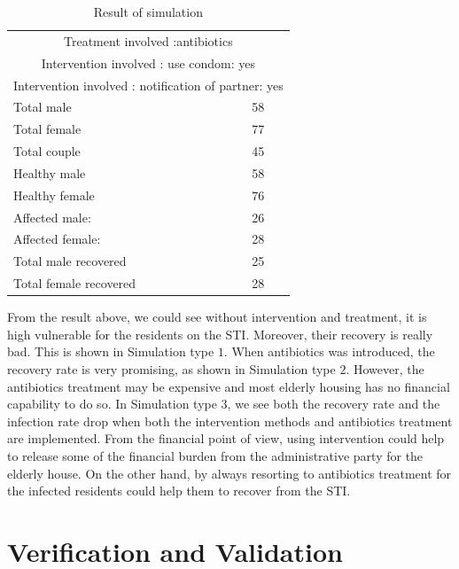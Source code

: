\documentclass{article}
\begin{document}
\begin{normalsize}
\begin{table}[H]
\begin{tabular}{ |p{7cm}|p{7cm}| }
		\multicolumn{2}{|c|}{Treatment involved :antibiotics} \\
		\multicolumn{2}{|c|}{Intervention involved : use condom: yes} \\
		\multicolumn{2}{|c|}{Intervention involved : notification of partner: yes} \\
		\hline
		Total male & 58\\
		Total female & 77\\
		Total couple & 45\\
		Healthy male & 58\\
		Healthy female & 76\\
		Affected male: & 26\\
		Affected female: & 28\\
		Total male recovered & 25\\
		Total female recovered & 28\\
		\hline
	\end{tabular}
	\caption{Result of simulation}
	\label{tab:result}
\end{table}

From the result above, we could see without intervention and treatment, it is high vulnerable for the residents on the STI. Moreover, their recovery is really bad. This is shown in Simulation type $1$. When antibiotics was introduced, the recovery rate is very promising, as shown in Simulation type $2$. However, the antibiotics treatment may be expensive and most elderly housing has no financial capability to do so. In Simulation type $3$, we see both the recovery rate and the infection rate drop when both the intervention methods and antibiotics treatment are implemented. From the financial point of view, using intervention could help to release some of the financial burden from the administrative party for the elderly house. On the other hand, by always resorting to antibiotics treatment for the infected residents could help them to recover from the STI.

\section{Verification and Validation}

\end{normalsize}
\end{document}

